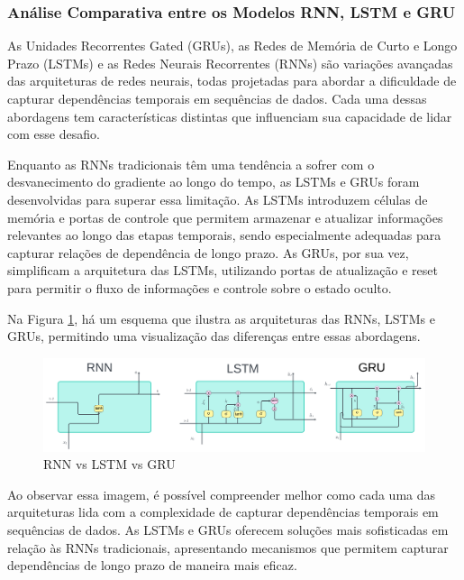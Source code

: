 \subsubsection{An\'alise Comparativa entre os Modelos RNN, LSTM e GRU}

As Unidades Recorrentes Gated (GRUs), as Redes de Memória de Curto e Longo Prazo (LSTMs) e as Redes Neurais Recorrentes (RNNs) são variações avançadas das arquiteturas de redes neurais, todas projetadas para abordar a dificuldade de capturar dependências temporais em sequências de dados. Cada uma dessas abordagens tem características distintas que influenciam sua capacidade de lidar com esse desafio.

Enquanto as RNNs tradicionais têm uma tendência a sofrer com o desvanecimento do gradiente ao longo do tempo, as LSTMs e GRUs foram desenvolvidas para superar essa limitação. As LSTMs introduzem células de memória e portas de controle que permitem armazenar e atualizar informações relevantes ao longo das etapas temporais, sendo especialmente adequadas para capturar relações de dependência de longo prazo. As GRUs, por sua vez, simplificam a arquitetura das LSTMs, utilizando portas de atualização e reset para permitir o fluxo de informações e controle sobre o estado oculto.

Na Figura \ref{fig:rnn-vs-lstm-vs-gru-1024x308}, há um esquema que ilustra as arquiteturas das RNNs, LSTMs e GRUs, permitindo uma visualização das diferenças entre essas abordagens.

\begin{figure}[!htpb]
	\centering
	\caption{RNN vs LSTM vs GRU}
	\label{fig:rnn-vs-lstm-vs-gru-1024x308}
	\includegraphics[width=1\linewidth]{Apendices/Figuras/modelagem-24h/RNN-vs-LSTM-vs-GRU-1024x308}
\end{figure}


Ao observar essa imagem, é possível compreender melhor como cada uma das arquiteturas lida com a complexidade de capturar dependências temporais em sequências de dados. As LSTMs e GRUs oferecem soluções mais sofisticadas em relação às RNNs tradicionais, apresentando mecanismos que permitem capturar dependências de longo prazo de maneira mais eficaz.

